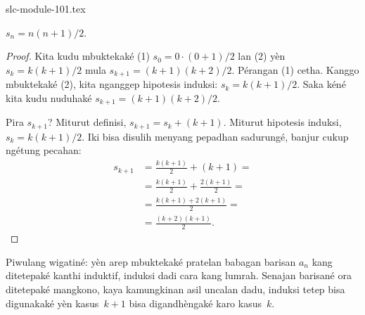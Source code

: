 \begin{filecontents*}[overwrite]{slc-module-101.tex}
\begin{prop}
  $s_n = n(n+1)/2$.
\end{prop}

\begin{proof}
  Kita kudu mbuktekaké (1)
  $s_0 = 0\cdot(0 + 1)/2$ lan (2)
  yèn $s_k =
  k(k+1)/2$ mula
  $s_{k+1} = (k+1)(k+2)/2$.
  Pérangan (1) cetha. Kanggo
  mbuktekaké (2), kita nganggep
  hipotesis induksi:
  $s_k = k(k+1)/2$. Saka kéné
  kita kudu nuduhaké
  $s_{k+1} = (k+1)(k+2)/2$.

  Pira $s_{k+1}$? Miturut definisi,
  $s_{k+1} = s_k + (k+1)$.
  Miturut hipotesis induksi,
  $s_k = k(k+1)/2$. Iki bisa
  disulih menyang pepadhan sadurungé,
  banjur cukup ngétung pecahan:
  \begin{align*}
    s_{k+1} & = \frac{k(k+1)}{2} + (k+1) = {}\\
    & = \frac{k(k+1)}{2} + \frac{2(k+1)}{2} = {}\\
    & = \frac{k(k+1) + 2(k+1)}{2} = {}\\
    & = \frac{(k+2)(k+1)}{2}.
  \end{align*}
\end{proof}

Piwulang wigatiné: yèn arep mbuktekaké
pratelan babagan barisan $a_n$ kang
ditetepaké kanthi induktif,
induksi dadi cara kang lumrah.
Senajan barisané ora ditetepaké
mangkono, kaya kamungkinan asil
uncalan dadu, induksi tetep bisa
digunakaké yèn kasus~$k+1$
bisa digandhèngaké karo kasus~$k$.


\end{filecontents*}



